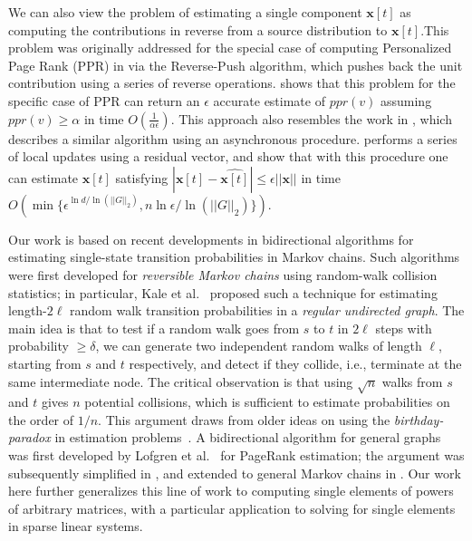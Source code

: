 We can also view the problem of estimating a single component $\mathbf{x}[t]$ as computing the contributions in reverse from a source distribution to $\mathbf{x}[t]$.This problem was originally addressed for the special case of computing Personalized Page Rank (PPR) in \cite{andersen2007local} via the Reverse-Push algorithm, which pushes back the unit contribution using a series of reverse operations. \cite{andersen2007local} shows that this problem for the specific case of PPR can return an $\epsilon$ accurate estimate of $ppr(v)$ assuming $ppr(v) \geq \alpha$ in time $O\left( \frac{1}{\alpha \epsilon}\right)$.
This approach also resembles the work in \cite{lee2014asynchronous}, which describes a similar algorithm using an asynchronous procedure. \cite{lee2014asynchronous} performs a series of local updates using a residual vector, and show that with this procedure one can estimate $\mathbf{x}[t]$ satisfying $|\mathbf{x}[t] - \hat{\mathbf{x}[t]}| \leq \epsilon ||\mathbf{x}||$ in time $O\left(\min\{ \epsilon^{\ln d /\ln (|| G||_2)}, n \ln \epsilon / \ln (||G||_2)\} \right)$. 

Our work is based on recent developments in bidirectional algorithms for estimating single-state transition probabilities in Markov chains.
Such algorithms were first developed for \emph{reversible Markov chains} using random-walk collision statistics; in particular, Kale et al.~\cite{Kale2008} proposed such a technique for estimating length-$2\ell$ random walk transition probabilities in a \emph{regular undirected graph}.
The main idea is that to test if a random walk goes from $s$ to $t$ in $2\ell$ steps with probability $\geq\delta$, we can generate two independent random walks of length $\ell$, starting from $s$ and $t$ respectively, and detect if they collide, i.e., terminate at the same intermediate node. 
The critical observation is that using $\sqrt{n}$ walks from $s$ and $t$ gives $n$ potential collisions, which is sufficient to estimate probabilities on the order of $1/n$.
This argument draws from older ideas on using the \emph{birthday-paradox} in estimation problems~\cite{Motwani2007}.
A bidirectional algorithm for general graphs was first developed by Lofgren et al.~\cite{Lofgren2014} for PageRank estimation; the argument was subsequently simplified in \cite{lofgren2016personalized}, and extended to general Markov chains in \cite{banerjee2015fast}. 
Our work here further generalizes this line of work to computing single elements of powers of arbitrary matrices, with a particular application to solving for single elements in sparse linear systems.


